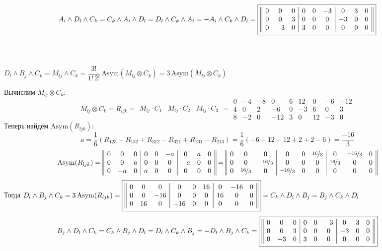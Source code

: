 \documentclass{article}
\newcommand*\squared[1]{\tikz[baseline=(char.base)]{
            \node[shape=rectangle,draw,inner sep=4pt] (char) {#1};}}
\begin{document}
$$A_i \wedge D_l \wedge C_k = C_k \wedge A_i \wedge D_l = D_l \wedge C_k \wedge A_i = - A_i \wedge C_k \wedge D_l = \squared{$\begin{array}{||ccc|ccc|ccc||}
0 & 0 & 0 & 0 & 0 & -3 & 0 & 3 & 0 \\
0 & 0 & 3 & 0 & 0 & 0 & -3 & 0 & 0 \\
0 & -3 & 0 & 3 & 0 & 0 & 0 & 0 & 0
\end{array}$}$$
\, \\ \, \\
\begin{center}
$D_l \wedge B_j \wedge C_k = M_{lj} \wedge C_k = \dfrac{3!}{1!\,2!}\,\text{Asym}(M_{lj}\otimes C_k) = 3\,\text{Asym}(M_{lj}\otimes C_k)$
\end{center}
Вычислим $M_{lj}\otimes C_k$:
$$M_{lj}\otimes C_k = R_{ljk} = \begin{array}{||c|c|c||}
M_{lj}\cdot C_1 & M_{lj}\cdot C_2 & M_{lj}\cdot C_3
\end{array} = \begin{array}{||ccc|ccc|ccc||}
0 & -4 & -8 & 0 & 6 & 12 & 0 & -6 & -12 \\
4 & 0 & 2 & -6 & 0 & -3 & 6 & 0 & 3 \\
8 & -2 & 0 & -12 & 3 & 0 & 12 & -3 & 0
\end{array}$$
Теперь найдём $\text{Asym}(R_{ljk})$:
$$a = \frac{1}{6}(R_{123} - R_{132} + R_{312} - R_{321} + R_{231} - R_{213}) = \frac{1}{6}(-6 - 12 -12 + 2 + 2 - 6) = \frac{-16}{3}$$
$$\text{Asym}(R_{ljk}) = \begin{array}{||ccc|ccc|ccc||}
0 & 0 & 0 & 0 & 0 & -a & 0 & a & 0 \\
0 & 0 & a & 0 & 0 & 0 & -a & 0 & 0 \\
0 & -a & 0 & a & 0 & 0 & 0 & 0 & 0
\end{array} =  \begin{array}{||ccc|ccc|ccc||}
0 & 0 & 0 & 0 & 0 & \nicefrac{16}{3} & 0 & \nicefrac{-16}{3} & 0 \\
0 & 0 & \nicefrac{-16}{3} & 0 & 0 & 0 & \nicefrac{16}{3} & 0 & 0 \\
0 & \nicefrac{16}{3} & 0 & \nicefrac{-16}{3} & 0 & 0 & 0 & 0 & 0
\end{array}$$
Тогда $D_l \wedge B_j \wedge C_k = 3\,\text{Asym}(R_{ljk}) = \squared{$\begin{array}{||ccc|ccc|ccc||}
0 & 0 & 0 & 0 & 0 & 16 & 0 & -16 & 0 \\
0 & 0 & -16 & 0 & 0 & 0 & 16 & 0 & 0 \\
0 & 16 & 0 & -16 & 0 & 0 & 0 & 0 & 0
\end{array}$} = C_k \wedge D_l \wedge B_j = B_j \wedge C_k \wedge D_l$
$$B_j \wedge D_l \wedge C_k = C_k \wedge B_j \wedge D_l = D_l \wedge C_k \wedge B_j = - D_l \wedge B_j \wedge C_k = \squared{$\begin{array}{||ccc|ccc|ccc||}
0 & 0 & 0 & 0 & 0 & -3 & 0 & 3 & 0 \\
0 & 0 & 3 & 0 & 0 & 0 & -3 & 0 & 0 \\
0 & -3 & 0 & 3 & 0 & 0 & 0 & 0 & 0
\end{array}$}$$
\end{document}
